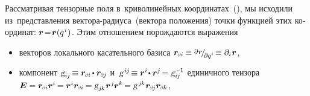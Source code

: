 \begin{otherlanguage}{russian}

\noindent
Рассматривая тензорные поля в~криволинейных координатах~(), мы исходили из~представления вектора\hbox{-}радиуса~(вектора положения) точки функцией этих координат:
${\bm{r} \hspace{-0.4ex} = \hspace{-0.4ex} \bm{r}(q^{\hspace{.1ex}i}\hspace{.1ex})}$.
Этим отношением порождаются выражения

\nopagebreak\begin{itemize}
\item векторов локального касательного базиса ${%
\locationvector_\differentialindex{i} \hspace{-0.16ex} \equiv \smash{ \raisemath{.16em}{\scalebox{0.8}{$ \partial \hspace{.1ex} \locationvector $}} \hspace{-0.3ex} / \hspace{-0.4ex} \raisemath{-0.32em}{\scalebox{0.8}{$ \partial q^{\hspace{.1ex}i} $}} } \hspace{-0.15ex} \equiv \partial_i \hspace{.1ex} \locationvector%
}$,
%
\item компонент ${\textsl{g}_{i\hspace{-0.1ex}j} \hspace{-0.24ex} \equiv \locationvector_\differentialindex{i} \hspace{-0.16ex} \dotp \locationvector_\differentialindex{\hspace{-0.1ex}j}}$ и~${\textsl{g}^{\hspace{.25ex}i\hspace{-0.1ex}j} \hspace{-0.32ex} \equiv \locationvector^i \hspace{-0.32ex} \dotp \locationvector^j \hspace{-0.32ex} = \smash{\textsl{g}_{i\hspace{-0.1ex}j}^{\hspace{.33ex}\expminusone}}}$ единичного  тензора~${\UnitDyad = \locationvector_\differentialindex{i} \locationvector^i \hspace{-0.2ex} = \locationvector^i \locationvector_\differentialindex{i} \hspace{-0.15ex} = \textsl{g}_{j\hspace{-0.1ex}k} \hspace{.1ex} \locationvector^{\hspace{.1ex}j} \hspace{-0.1ex} \locationvector^{k} \hspace{-0.25ex} = \textsl{g}^{\hspace{.25ex}j\hspace{-0.1ex}k} \hspace{.1ex} \locationvector_\differentialindex{\hspace{-0.1ex}j} \locationvector_\differentialindex{k}}$,

\end{itemize}
\end{otherlanguage}
